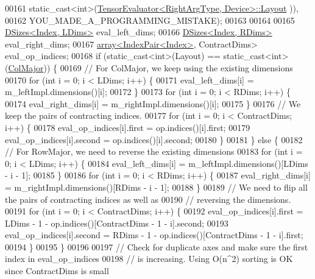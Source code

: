 \begin{DoxyCode}
00161                static\_cast<int>(\hyperlink{struct_eigen_1_1_tensor_evaluator}{TensorEvaluator<RightArgType, Device>::Layout}
      )),
00162                         YOU\_MADE\_A\_PROGRAMMING\_MISTAKE);
00163 
00164 
00165     \hyperlink{struct_eigen_1_1_d_sizes}{DSizes<Index, LDims>} eval\_left\_dims;
00166     \hyperlink{struct_eigen_1_1_d_sizes}{DSizes<Index, RDims>} eval\_right\_dims;
00167     \hyperlink{class_eigen_1_1array}{array<IndexPair<Index>}, ContractDims> eval\_op\_indices;
00168     \textcolor{keywordflow}{if} (static\_cast<int>(Layout) == static\_cast<int>(\hyperlink{group__enums_ggaacded1a18ae58b0f554751f6cdf9eb13a0cbd4bdd0abcfc0224c5fcb5e4f6669a}{ColMajor})) \{
00169       \textcolor{comment}{// For ColMajor, we keep using the existing dimensions}
00170       \textcolor{keywordflow}{for} (\textcolor{keywordtype}{int} i = 0; i < LDims; i++) \{
00171         eval\_left\_dims[i] = m\_leftImpl.dimensions()[i];
00172       \}
00173       \textcolor{keywordflow}{for} (\textcolor{keywordtype}{int} i = 0; i < RDims; i++) \{
00174         eval\_right\_dims[i] = m\_rightImpl.dimensions()[i];
00175       \}
00176       \textcolor{comment}{// We keep the pairs of contracting indices.}
00177       \textcolor{keywordflow}{for} (\textcolor{keywordtype}{int} i = 0; i < ContractDims; i++) \{
00178         eval\_op\_indices[i].first = op.indices()[i].first;
00179         eval\_op\_indices[i].second = op.indices()[i].second;
00180       \}
00181     \} \textcolor{keywordflow}{else} \{
00182       \textcolor{comment}{// For RowMajor, we need to reverse the existing dimensions}
00183       \textcolor{keywordflow}{for} (\textcolor{keywordtype}{int} i = 0; i < LDims; i++) \{
00184         eval\_left\_dims[i] = m\_leftImpl.dimensions()[LDims - i - 1];
00185       \}
00186       \textcolor{keywordflow}{for} (\textcolor{keywordtype}{int} i = 0; i < RDims; i++) \{
00187         eval\_right\_dims[i] = m\_rightImpl.dimensions()[RDims - i - 1];
00188       \}
00189       \textcolor{comment}{// We need to flip all the pairs of contracting indices as well as}
00190       \textcolor{comment}{// reversing the dimensions.}
00191       \textcolor{keywordflow}{for} (\textcolor{keywordtype}{int} i = 0; i < ContractDims; i++) \{
00192         eval\_op\_indices[i].first = LDims - 1 - op.indices()[ContractDims - 1 - i].second;
00193         eval\_op\_indices[i].second = RDims - 1 - op.indices()[ContractDims - 1 - i].first;
00194       \}
00195     \}
00196 
00197     \textcolor{comment}{// Check for duplicate axes and make sure the first index in eval\_op\_indices}
00198     \textcolor{comment}{// is increasing. Using O(n^2) sorting is OK since ContractDims is small}

\end{DoxyCode}
